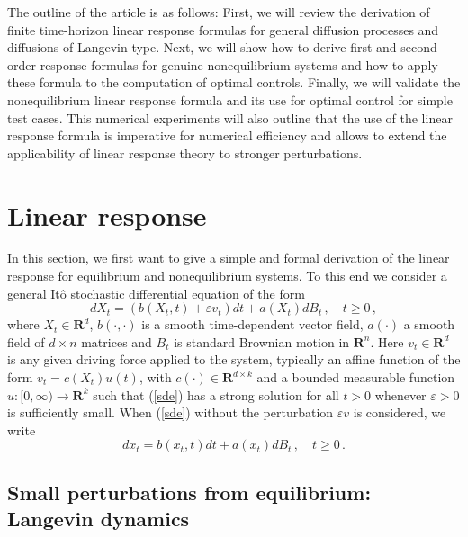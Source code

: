 \documentclass[]{tMPH2e}
\newcommand{\R}{{\mathbf R}}
\newcommand{\eps}{\varepsilon}
\begin{document}
The outline of the article is as follows: First, we will review the derivation of finite time-horizon linear response formulas for general diffusion processes and diffusions of Langevin type. Next, we will show how to derive first and second order response formulas for genuine nonequilibrium systems and how to apply these formula to the computation of optimal controls. Finally, we will validate the nonequilibrium linear response formula and its use for optimal control for simple test cases. This numerical experiments will also outline that the use of the linear response formula is imperative for numerical efficiency and allows to extend the applicability of linear response theory to stronger perturbations. 


 

\section{Linear response}


In this section, we first want to give a simple and formal derivation of the linear response for equilibrium and nonequilibrium systems. To this end we consider a general It\^o stochastic differential equation of the form
\begin{equation}\label{sde}
dX_{t} = (b(X_{t},t) + \eps v_{t})dt +a(X_{t})dB_{t}\,,\quad t\ge 0\,,
\end{equation}
where $X_{t}\in\R^{d}$, $b(\cdot,\cdot)$ is a smooth time-dependent vector field, $a(\cdot)$ a smooth field of $d\times n$ matrices and $B_{t}$ is standard Brownian motion in $\R^{n}$. Here $v_{t}\in\R^{d}$ is any given driving force applied to the system, typically an affine function of the form $v_{t}=c(X_{t})u(t)$, with $c(\cdot)\in\R^{d\times k}$ and a bounded measurable function $u\colon[0,\infty)\to\R^{k}$ such that (\ref{sde}) has a strong solution for all $t> 0$ whenever $\eps>0$ is sufficiently small. When (\ref{sde}) without the perturbation $\eps v$ is considered, we write
\begin{equation}\label{sdewo}
dx_{t} = b(x_{t},t)dt +a(x_{t})dB_{t}\,,\quad t\ge 0\,. 
\end{equation}


  




\subsection{Small perturbations from equilibrium: Langevin dynamics}\label{ssec:equiLRT}
\end{document}
